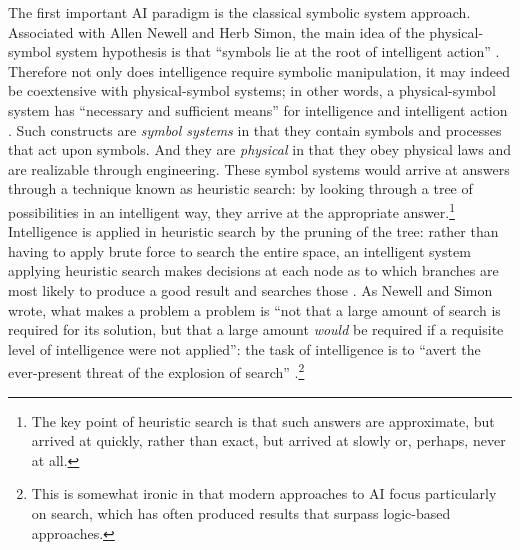 The first important AI paradigm is the classical symbolic system
approach. Associated with Allen Newell and Herb Simon, the main idea of the
physical-symbol system hypothesis is that ``symbols lie at the root of
intelligent action'' \cite[p. 109]{newellsimon}. Therefore not only
does intelligence require symbolic manipulation, it may indeed be
coextensive with physical-symbol systems; in other words, a
physical-symbol system has ``necessary and sufficient means'' for
intelligence and intelligent action \cite[p. 111]{newellsimon}. Such
constructs are \emph{symbol systems} in that they contain symbols and processes
that act upon symbols. And they are \emph{physical} in that they obey
physical laws and are realizable through engineering.
These symbol systems would arrive at answers through a technique known as
heuristic search: by looking through a tree of possibilities in an
intelligent way, they arrive at the appropriate answer.\footnote{The key
  point of heuristic search is that such answers are approximate, but
  arrived at quickly, rather than exact, but arrived at slowly or,
  perhaps, never at all.} Intelligence is applied in heuristic search
by the pruning of the tree: rather than having to apply brute force to
search the entire space, an intelligent system applying heuristic
search makes decisions at each node as to which branches are most
likely to produce a good result and searches those \cite[p.
  124]{newellsimon}. As Newell and Simon wrote, what makes a problem a
problem is ``not that a large amount of search is required for its
solution, but that a large amount \emph{would} be required if a requisite
level of intelligence were not applied'': the task of intelligence is
to ``avert the ever-present threat of the explosion of
search'' \cite[p. 125]{newellsimon}.\footnote{This is somewhat ironic in that
  modern approaches to AI focus particularly on search, which has
  often produced results that surpass logic-based approaches.} 

